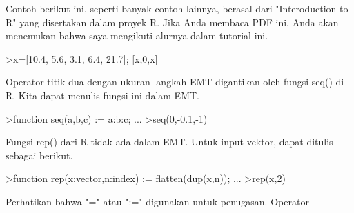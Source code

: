 \documentclass[a4paper,10pt]{article}
\begin{document}
\begin{eulernotebook}
\begin{eulercomment}
\begin{eulercomment}
\begin{eulercomment}
\begin{eulercomment}
\begin{eulercomment}
\begin{eulercomment}
\begin{eulercomment}
\begin{eulercomment}
\begin{eulercomment}
\begin{eulercomment}
\begin{eulercomment}
\begin{eulercomment}
\begin{eulercomment}
\begin{eulercomment}
\begin{eulercomment}
\begin{eulercomment}
\begin{eulercomment}
\begin{eulercomment}
\begin{eulercomment}
\begin{eulercomment}
\begin{eulercomment}
\begin{eulercomment}
\begin{eulercomment}
\begin{eulercomment}
\begin{eulercomment}
\begin{eulercomment}
\begin{eulercomment}
\begin{eulercomment}
\begin{eulercomment}
\begin{eulercomment}
\begin{eulercomment}
\begin{eulercomment}
\begin{eulercomment}
\begin{eulercomment}
\begin{eulercomment}
Contoh berikut ini, seperti banyak contoh lainnya, berasal dari
"Interoduction to R" yang disertakan dalam proyek R. Jika Anda membaca
PDF ini, Anda akan menemukan bahwa saya mengikuti alurnya dalam
tutorial ini.
\end{eulercomment}
\begin{eulerprompt}
>x=[10.4, 5.6, 3.1, 6.4, 21.7]; [x,0,x]
\end{eulerprompt}
\begin{euleroutput}
  [10.4,  5.6,  3.1,  6.4,  21.7,  0,  10.4,  5.6,  3.1,  6.4,  21.7]
\end{euleroutput}
\begin{eulercomment}
Operator titik dua dengan ukuran langkah EMT digantikan oleh fungsi
seq() di R. Kita dapat menulis fungsi ini dalam EMT.
\end{eulercomment}
\begin{eulerprompt}
>function seq(a,b,c) := a:b:c; ...
>seq(0,-0.1,-1)
\end{eulerprompt}
\begin{euleroutput}
  [0,  -0.1,  -0.2,  -0.3,  -0.4,  -0.5,  -0.6,  -0.7,  -0.8,  -0.9,  -1]
\end{euleroutput}
\begin{eulercomment}
Fungsi rep() dari R tidak ada dalam EMT. Untuk input vektor, dapat
ditulis sebagai berikut.
\end{eulercomment}
\begin{eulerprompt}
>function rep(x:vector,n:index) := flatten(dup(x,n)); ...
>rep(x,2)
\end{eulerprompt}
\begin{euleroutput}
  [10.4,  5.6,  3.1,  6.4,  21.7,  10.4,  5.6,  3.1,  6.4,  21.7]
\end{euleroutput}
\begin{eulercomment}
Perhatikan bahwa "=" atau ":=" digunakan untuk penugasan. Operator

\end{eulercomment}
\end{eulercomment}
\end{eulercomment}
\end{eulercomment}
\end{eulercomment}
\end{eulercomment}
\end{eulercomment}
\end{eulercomment}
\end{eulercomment}
\end{eulercomment}
\end{eulercomment}
\end{eulercomment}
\end{eulercomment}
\end{eulercomment}
\end{eulercomment}
\end{eulercomment}
\end{eulercomment}
\end{eulercomment}
\end{eulercomment}
\end{eulercomment}
\end{eulercomment}
\end{eulercomment}
\end{eulercomment}
\end{eulercomment}
\end{eulercomment}
\end{eulercomment}
\end{eulercomment}
\end{eulercomment}
\end{eulercomment}
\end{eulercomment}
\end{eulercomment}
\end{eulercomment}
\end{eulercomment}
\end{eulercomment}
\end{eulercomment}
\end{eulernotebook}
\end{document}
